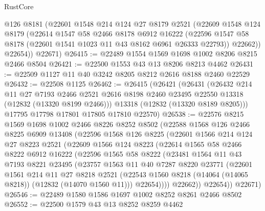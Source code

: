 \begin{lexlean}{RustCore}
\begin{coremodule}
        @126
        @8181
        (@22601
          @1548
          @214
          @124
          @27
          @8179
          @2521
          (@22609
            @1548
            @124
            @8179
            (@22614
              @1547
              @58
              @2466
              @8178
              @6912
              @16222
              (@22596 @1547 @58 @8178 (@22601 @1541 @1023 @11 @43 @8162 @6961 @26333 @22793))
              @22662))
          @22654))
      @22671)
@26415 := @22489 @1554 @1569 @1698 @1002 @8206 @8215 @2466 @8504
@26421 := @22500 @1553 @43 @13 @8206 @8213 @4462
@26431 := @22509 @1127 @11 @40 @3242 @8205 @8212 @2616 @8188 @2460 @22529
@26432 := @22508 @1125
@26462 := @26415
    (@26421
      (@26431
        (@26432
          @214
          @11
          @27
          @7193
          @2466
          @2521
          @2616
          @8198
          @2460
          @23495
          @22550
          @13318
          (@12832 (@13320 @8199 @2466)))
        @13318
        (@12832 (@13320 @8189 @8205)))
      @17795
      @17798
      @17801
      @17805
      @17810
      @22570)
@26538 := @22576
    @8215
    @1569
    @1698
    @1002
    @2466
    @8226
    @8252
    @8502
    (@22588
      @1568
      @126
      @2466
      @8225
      @6909
      @13408
      (@22596
        @1568
        @126
        @8225
        (@22601
          @1566
          @214
          @124
          @27
          @8223
          @2521
          (@22609
            @1566
            @124
            @8223
            (@22614
              @1565
              @58
              @2466
              @8222
              @6912
              @16222
              (@22596
                @1565
                @58
                @8222
                (@23481
                  @1564
                  @11
                  @43
                  @7193
                  @8221
                  @23495
                  (@23757
                    @1563
                    @11
                    @40
                    @7287
                    @8220
                    @23771
                    (@22601
                      @1561
                      @214
                      @11
                      @27
                      @8218
                      @2521
                      (@22543 @1560 @8218 (@14064 (@14065 @8218)) (@12832 (@14070 @1560 @11)))
                      @22654))))
              @22662))
          @22654))
      @22671)
@26546 := @22489 @1580 @1586 @1697 @1002 @8252 @8261 @2466 @8502
@26552 := @22500 @1579 @43 @13 @8252 @8259 @4462

\end{coremodule}
\end{lexlean}
